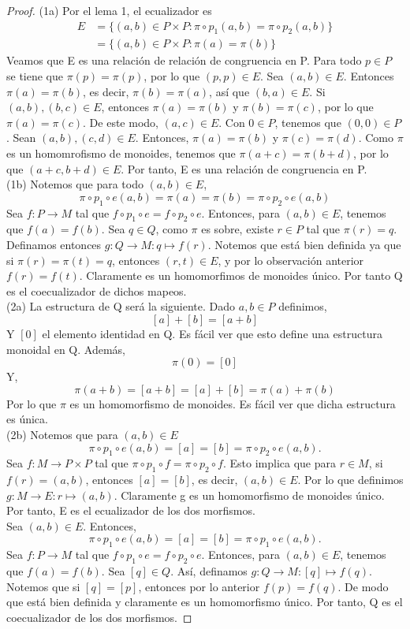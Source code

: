 \documentclass[12pt,spanish]{amsart}
\theoremstyle{definition}
\theoremstyle{remark}
\begin{document}
\begin{proof}
(1a) Por el lema 1, el ecualizador es
\begin{equation*}
\begin{split}
E &= \{(a,b)\in P\times P:\pi\circ p_{1}(a,b)=\pi\circ p_{2}(a,b)\} \\
&= \{(a,b)\in P\times P: \pi(a)=\pi(b)\}
\end{split}
\end{equation*}
Veamos que E es una relación de relación de congruencia en P. Para todo $p\in P$ se tiene que $\pi(p)=\pi(p)$, por lo que $(p,p)\in E$. Sea $(a,b)\in E$. Entonces $\pi(a)= \pi(b)$, es decir, $\pi(b)= \pi(a)$, así que $(b,a)\in E$. Si $(a,b),(b,c)\in E$, entonces $\pi(a)= \pi(b)$ y $\pi(b)= \pi(c)$, por lo que $\pi(a)= \pi(c)$. De este modo, $(a,c)\in E$. Con $0\in P$, tenemos que $(0,0)\in P$. Sean $(a,b),(c,d)\in E$. Entonces, $\pi(a)=\pi(b)$ y $\pi(c)=\pi(d)$. Como $\pi$ es un homomrofismo de monoides, tenemos que $\pi(a+c)=\pi(b+d)$, por lo que $(a+c,b+d)\in E$. Por tanto, E es una relación de congruencia en P. \\
(1b) Notemos que para todo $(a,b)\in E$,
$$\pi\circ p_{1}\circ e(a,b)=\pi(a) = \pi(b) = \pi\circ p_{2}\circ e(a,b)$$
Sea $f:P \to M$ tal que $f\circ p_{1}\circ e = f\circ p_{2}\circ e$. Entonces, para $(a,b)\in E$, tenemos que $f(a)=f(b)$. Sea $q\in Q$, como $\pi$ es sobre, existe $r\in P$ tal que $\pi(r)=q$. Definamos entonces $g:Q \to M:q \mapsto f(r)$. Notemos que está bien definida ya que si $\pi(r)=\pi(t)=q$, entonces $(r,t)\in E$, y por lo observación anterior $f(r)=f(t)$. Claramente es un homomorfimos de monoides único. Por tanto Q es el coecualizador de dichos mapeos. \\
(2a) La estructura de Q será la siguiente. Dado $a,b\in P$ definimos,
$$[a]+[b] = [a+b]$$ 
Y $[0]$ el elemento identidad en Q. Es fácil ver que esto define una estructura monoidal en Q. Además,
$$\pi(0) = [0]$$
Y,
$$\pi(a+b) = [a+b] = [a]+[b] = \pi(a)+\pi(b)$$
Por lo que $\pi$ es un homomorfismo de monoides. Es fácil ver que dicha estructura es única. \\ 
(2b) Notemos que para $(a,b)\in E$
$$\pi\circ p_{1} \circ e(a,b) = [a] = [b] = \pi\circ p_{2}\circ e(a,b).$$
Sea $f:M \to P\times P$ tal que $\pi\circ p_{1}\circ f = \pi\circ p_{2}\circ f$. Esto implica que para $r\in M$, si $f(r)=(a,b)$, entonces $[a]=[b]$, es decir, $(a,b)\in E$. Por lo que definimos $g:M \to E:r \mapsto (a,b)$. Claramente g es un homomorfismo de monoides único. Por tanto, E es el ecualizador de los dos morfismos. \\
Sea $(a,b)\in E$. Entonces, 
$$\pi\circ p_{1}\circ e(a,b)= [a] = [b] = \pi\circ p_{1}\circ e(a,b).$$
Sea $f:P \to M$ tal que $f\circ p_{1}\circ e = f\circ p_{2}\circ e$. Entonces, para $(a,b)\in E$, tenemos que $f(a)=f(b)$. Sea $[q]\in Q$. Así, definamos $g:Q \to M:[q] \mapsto f(q)$. Notemos que si $[q] = [p]$, entonces por lo anterior $f(p)=f(q)$. De modo que está bien definida y claramente es un homomorfismo único. Por tanto, Q es el coecualizador de los dos morfismos.
\end{proof}
\end{document}
